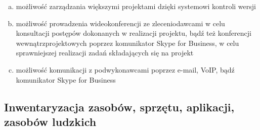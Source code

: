 \documentclass[a4paper, 12pt]{article}
\begin{document}
\begin{enumerate}[a)]

	\item możliwość zarządzania większymi projektami dzięki systemowi kontroli wersji
	
	\item możliwość prowadzenia wideokonferencji ze zleceniodawcami w celu konsultacji postępów dokonanych w realizacji projektu, bądź też konferencji wewnątrzprojektowych poprzez komunikator Skype for Business, w celu sprawniejszej realizacji zadań składających się na projekt
	
	\item możliwość komunikacji z podwykonawcami poprzez e-mail, VoIP, bądź komunikator Skype for Business
	
\end{enumerate}

\subsection{Inwentaryzacja zasobów, sprzętu, aplikacji, zasobów ludzkich}
\end{document}
